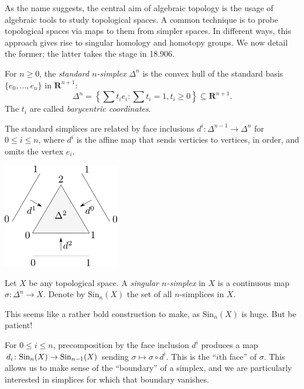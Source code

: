 As the name suggests, the central aim of algebraic topology is the usage of algebraic tools to study topological spaces. A common technique is to probe topological spaces via maps to them from simpler spaces. In different ways, this approach gives rise to singular homology and homotopy groups. We now detail the former; the latter takes the stage in 18.906.
\begin{definition}
For $n\geq 0$, the \emph{standard $n$-simplex} $\Delta^n$ is the convex hull of the standard basis $\{e_0,\ldots,e_n\}$ in $\mathbf{R}^{n+1}$:
$$\Delta^n = \left\{\sum t_i e_i : \sum t_i = 1, t_i\geq 0\right\}\subseteq\mathbf{R}^{n+1}.$$
The $t_i$ are called {\em barycentric coordinates}.
\end{definition}
The standard simplices are related by face inclusions $d^i\colon \Delta^{n-1} \to \Delta^{n}$ for $0\leq i \leq n$, where $d^i$ is the affine map that sends
verticies to vertices, in order, and omits the vertex $e_i$.

\begin{center}
\includegraphics[width=2in]{905/Figures/01-2-simplex.pdf}
\end{center}

\begin{definition}
Let $X$ be any topological space. A \emph{singular $n$-simplex} in $X$ is a continuous map $\sigma:\Delta^n\to X$. Denote by $\mathrm{Sin}_n(X)$ the set of all $n$-simplices in $X$.
\end{definition}
    
This seems like a rather bold construction to make, as $\mathrm{Sin}_n(X)$ is huge. But be patient! 

For $0\leq i \leq n$, precomposition by the face inclusion $d^i$ produces a map $d_i\colon \mathrm{Sin}_n(X)\to\mathrm{Sin}_{n-1}(X)$ sending $\sigma\mapsto\sigma\circ d^i$. This is the ``$i$th face'' of $\sigma$. This allows us to make sense of the ``boundary'' of a simplex, and we are particularly interested in simplices for which that boundary vanishes.

